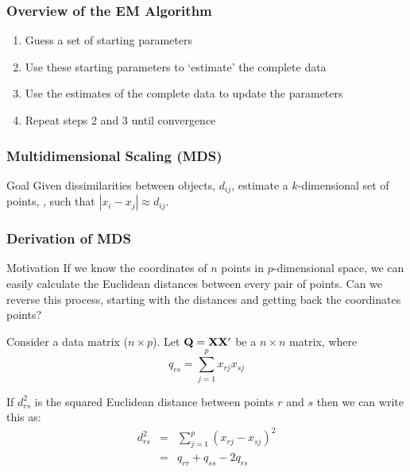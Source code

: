 \documentclass{beamer}
\begin{document}
\begin{frame}
  \frametitle{Overview of the EM Algorithm}

\begin{enumerate}
    \item Guess a set of starting parameters
    \item Use these starting parameters to `estimate' the complete data
    \item Use the estimates of the complete data to update the parameters
    \item Repeat steps 2 and 3 until convergence
\end{enumerate}

\end{frame}



{

}


\begin{frame}
  \frametitle{Multidimensional Scaling (MDS)}

\begin{block}{Goal}
Given dissimilarities between objects, $d_{ij}$, estimate a $k$-dimensional set of points, , such that $|x_i - x_j| \approx d_{ij}$.
\end{block}


\end{frame}

\begin{frame}[shrink=5]
\frametitle{Derivation of MDS}

\begin{block}{Motivation}
    If we know the coordinates of $n$ points in $p$-dimensional space, we can easily calculate the Euclidean distances between every pair of points. \alert{Can we reverse this process, starting with the distances and getting back the coordinates points?}
\end{block}

Consider a data matrix  ($n \times p$).  Let  $\mathbf{Q} = \mathbf{X}\mathbf{X}'$ be a $n \times n$ matrix, where
\[
q_{rs} = \sum_{j=1}^p x_{rj}x_{sj}
\]

If $d_{rs}^2$ is the squared Euclidean distance between points $r$ and $s$ then we can write this as:
\begin{eqnarray*}
d_{rs}^2 &=& \sum_{j=1}^p (x_{rj}-x_{sj})^2 \\
         &=& q_{rr} + q_{ss} - 2q_{rs}
\end{eqnarray*}

\end{frame}
\end{document}
